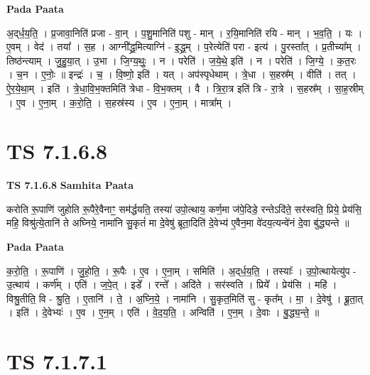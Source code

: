 \documentclass[17pt]{extarticle}
\begin{document}
\textbf{Pada Paata} \newline

अ॒द्‌र्ध॒य॒ति॒ । प्र॒जावा॒निति॑ प्रजा - वा॒न् । प॒शु॒मानिति॑ पशु - मान् । र॒यि॒मानिति॑ रयि - मान् । भ॒व॒ति॒ । यः । ए॒वम् । वेद॑ । तया᳚ । स॒ह । आग्नी᳚द्ध्र॒मित्याग्नि॑ - इ॒द्ध्र॒म् । प॒रेत्येति॑ परा - इत्य॑ । पु॒रस्ता᳚त् । प्र॒तीच्या᳚म् । तिष्ठ॑न्त्याम् । जु॒हु॒या॒त् । उ॒भा । जि॒ग्य॒थुः॒ । न । परेति॑ । ज॒ये॒थे॒ इति॑ । न । परेति॑ । जि॒ग्ये॒ । क॒त॒रः । च॒न । ए॒नोः॒ ॥ इन्द्रः॑ । च॒ । वि॒ष्णो॒ इति॑ । यत् । अप॑स्पृधेथाम् । त्रे॒धा । स॒हस्र᳚म् । वीति॑ । तत् । ऐ॒र॒ये॒था॒म् । इति॑ । त्रे॒धा॒वि॒भ॒क्तमिति॑ त्रेधा - वि॒भ॒क्तम् । वै । त्रि॒रा॒त्र इति॑ त्रि - रा॒त्रे । स॒हस्र᳚म् । सा॒ह॒स्रीम् । ए॒व । ए॒ना॒म् । क॒रो॒ति॒ । स॒हस्र॑स्य । ए॒व । ए॒ना॒म् । मात्रा᳚म् ।  \newline





\section{ TS 7.1.6.8 }

\textbf{TS 7.1.6.8 } \newline
\textbf{Samhita Paata} \newline

करोति रू॒पाणि॑ जुहोति रू॒पैरे॒वैनाꣳ॒॒ सम॑र्द्धयति॒ तस्या॑ उपो॒त्थाय॒ कर्ण॒मा ज॑पे॒दिडे॒ रन्तेऽदि॑ते॒ सर॑स्वति॒ प्रिये॒ प्रेय॑सि॒ महि॒ विश्रु॑त्ये॒तानि॑ ते अघ्निये॒ नामा॑नि सु॒कृतं॑ मा दे॒वेषु॑ ब्रूता॒दिति॑ दे॒वेभ्य॑ ए॒वैन॒मा वे॑दय॒त्यन्वे॑नं दे॒वा बु॑द्ध्यन्ते ॥ \newline

\textbf{Pada Paata} \newline

क॒रो॒ति॒ । रू॒पाणि॑ । जु॒हो॒ति॒ । रू॒पैः । ए॒व । ए॒ना॒म् । समिति॑ । अ॒द्‌र्ध॒य॒ति॒ । तस्याः᳚ ।      उ॒पो॒त्थायेत्यु॑प - उ॒त्थाय॑ । कर्ण᳚म् । एति॑ । ज॒पे॒त् । इडे᳚ । रन्ते᳚ । अदि॑ते । सर॑स्वति । प्रिये᳚ । प्रेय॑सि । महि॑ । विश्रु॒तीति॒ वि - श्रु॒ति॒ । ए॒तानि॑ । ते॒ । अ॒घ्नि॒ये॒ । नामा॑नि । सु॒कृत॒मिति॑ सु - कृत᳚म् । मा॒ । दे॒वेषु॑ । ब्रू॒ता॒त् । इति॑ । दे॒वेभ्यः॑ । ए॒व । ए॒न॒म् । एति॑ । वे॒द॒य॒ति॒ । अन्विति॑ । ए॒न॒म् । दे॒वाः । बु॒द्ध्य॒न्ते॒ ॥  \newline





\section{ TS 7.1.7.1 }
\end{document}
